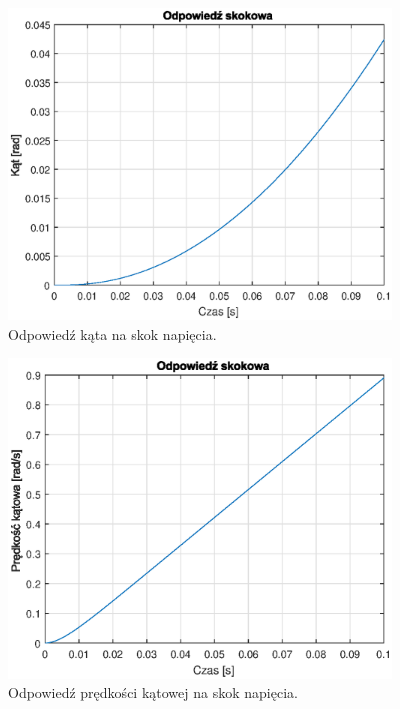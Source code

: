 \begin{figure}[h]
	\centering
	\includegraphics[width=4in]{Figures/step_ang.eps}
	\caption{Odpowiedź kąta na skok napięcia.}
	\label{fig:step2}
\end{figure}

\begin{figure}[h]
	\centering
	\includegraphics[width=4in]{Figures/step_vel.eps}
	\caption{Odpowiedź prędkości kątowej na skok napięcia.}
	\label{fig:step3}
\end{figure}